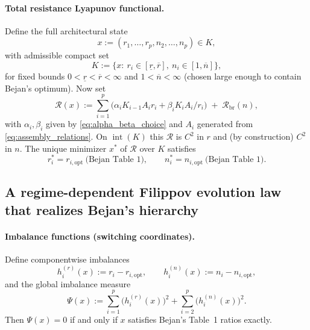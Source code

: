\documentclass[12pt]{article}
\theoremstyle{plain}
\theoremstyle{definition}
\theoremstyle{remark}
\newcommand{\opt}{\mathrm{opt}}
\begin{document}
\paragraph{Total resistance Lyapunov functional.}
Define the full architectural state
\[
x := (r_1,\dots,r_p,n_2,\dots,n_p) \in K,
\]
with admissible compact set
\begin{equation}
K
:=
\Big\{
x:\ r_i\in[\underline r,\overline r],\ n_i\in[1,\overline n]
\Big\},
\label{eq:K_compact_choice}
\end{equation}
for fixed bounds $0<\underline r<\overline r<\infty$ and $1<\overline n<\infty$
(chosen large enough to contain Bejan’s optimum).
Now set
\begin{equation}
\mathcal R(x)
:=
\sum_{i=1}^p \Big(\alpha_i K_{i-1} A_i r_i + \beta_i K_i A_i/r_i\Big)
\;+\;
\mathcal R_{\mathrm{br}}(n),
\label{eq:R_total}
\end{equation}
with $\alpha_i,\beta_i$ given by \eqref{eq:alpha_beta_choice} and $A_i$
generated from \eqref{eq:assembly_relations}. On $\operatorname{int}(K)$
this $\mathcal R$ is $C^2$ in $r$ and (by construction) $C^2$ in $n$. The unique minimizer $x^\ast$ of $\mathcal R$ over $K$ satisfies
\[
r_i^\ast=r_{i,\opt}\ \text{(Bejan Table~1)},\qquad
n_i^\ast=n_{i,\opt}\ \text{(Bejan Table~1)}.
\]

\subsection{A regime-dependent Filippov evolution law that realizes Bejan’s hierarchy}
\label{subsec:bejan_filippov_law}

\paragraph{Imbalance functions (switching coordinates).}
Define componentwise imbalances
\begin{equation}
h^{(r)}_i(x) := r_i-r_{i,\opt},
\qquad
h^{(n)}_i(x) := n_i-n_{i,\opt},
\label{eq:imbalance_components}
\end{equation}
and the global imbalance measure
\begin{equation}
\Psi(x)
:=
\sum_{i=1}^p \big(h^{(r)}_i(x)\big)^2
+
\sum_{i=2}^p \big(h^{(n)}_i(x)\big)^2.
\label{eq:Psi_bejan_application}
\end{equation}
Then $\Psi(x)=0$ if and only if $x$ satisfies Bejan’s Table~1 ratios exactly.
\end{document}
